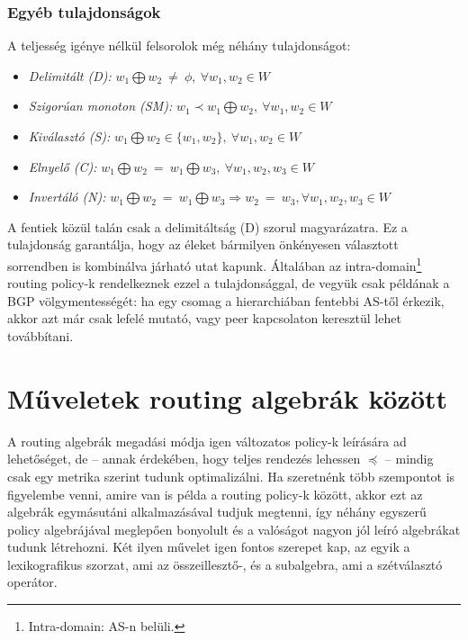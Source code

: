     \subsubsection{Egyéb tulajdonságok}
    A teljesség igénye nélkül felsorolok még néhány tulajdonságot\cite{Lexicographic_products_in_metarouting}:
    \begin{itemize}
      \item \emph{ Delimitált (D):} $w_{1} \bigoplus w_{2} ~\neq~\phi, ~\forall w_{1}, w_{2} \in W$
      \item \emph{ Szigorúan monoton (SM):} $w_{1} \prec w_{1} \bigoplus w_{2}, ~\forall w_{1}, w_{2} \in W$
      \item \emph{ Kiválasztó (S):} $w_{1} \bigoplus w_{2} \in \{w_{1}, w_{2}\}, ~\forall w_{1}, w_{2} \in W$
      \item \emph{ Elnyelő (C):} $w_{1} \bigoplus w_{2} ~=~ w_{1} \bigoplus w_{3}, ~\forall w_{1}, w_{2}, w_{3} \in W$
      \item \emph{ Invertáló (N):} $w_{1} \bigoplus w_{2} ~=~ w_{1} \bigoplus w_{3} \Rightarrow w_{2}~=~w_{3}, \forall w_{1}, w_{2}, w_{3} \in W$
    \end{itemize}

    A fentiek közül talán csak a delimitáltság (D) szorul magyarázatra. Ez a tulajdonság garantálja, hogy az éleket bármilyen önkényesen választott sorrendben is kombinálva járható utat kapunk. Általában az intra-domain\footnote{Intra-domain: AS-n belüli.} routing policy-k rendelkeznek ezzel a tulajdonsággal, de vegyük csak példának a BGP völgymentességét: ha egy csomag a hierarchiában fentebbi AS-től érkezik, akkor azt már csak lefelé mutató, vagy peer kapcsolaton keresztül lehet továbbítani.

  \section{Műveletek routing algebrák között}\label{section_algebramuveletek}
  A routing algebrák megadási módja igen változatos policy-k leírására ad lehetőséget, de -- annak érdekében, hogy teljes rendezés lehessen $\preceq$ -- mindig csak egy metrika szerint tudunk optimalizálni. Ha szeretnénk több szempontot is figyelembe venni, amire van is példa a routing policy-k között, akkor ezt az algebrák egymásutáni alkalmazásával tudjuk megtenni, így néhány egyszerű policy algebrájával meglepően bonyolult és a valóságot nagyon jól leíró algebrákat tudunk létrehozni\cite{Sobrinho_Metarouting}. Két ilyen művelet igen fontos szerepet kap, az egyik a lexikografikus szorzat, ami az összeillesztő-, és a subalgebra, ami a szétválasztó operátor\cite{Lexicographic_products_in_metarouting}.

